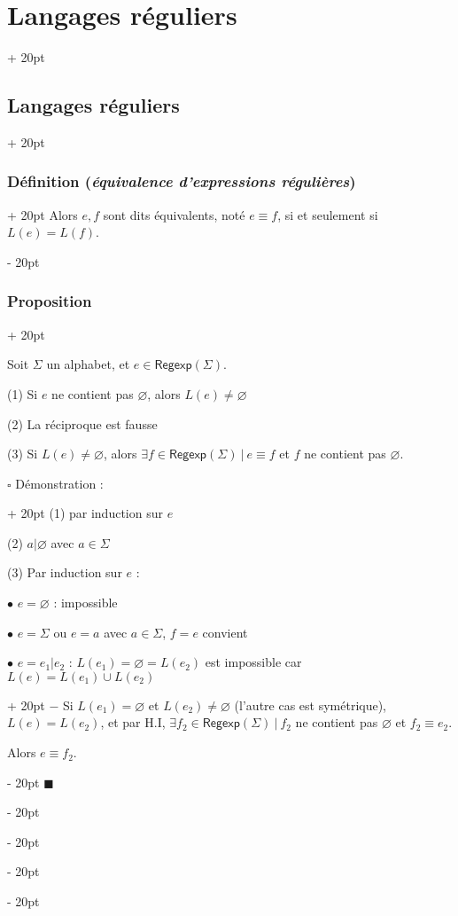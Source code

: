 \documentclass[a4paper, 12pt, twoside]{article}
\newcommand{\ind}[1][20pt]{\advance\leftskip + #1}
\newcommand{\deind}[1][20pt]{\advance\leftskip - #1}
\newenvironment{indt}[2][20pt]{#2 \par \ind[#1]}{\par \deind} %
\newenvironment{proof}[1][{Démonstration :}]{\begin{indt}{$\square$ #1}}{$\blacksquare$ \end{indt}}
\newcommand{\Regexp}{\mathsf{Regexp}}
\begin{document}
\begin{indt}{\section{Langages réguliers}}
\begin{indt}{\subsection{Langages réguliers}}
\begin{indt}{\subsubsection{Définition (\textit{équivalence d'expressions régulières})}}
                Alors $e, f$ sont dits équivalents, noté $e \equiv f$, si et seulement si $L(e) = L(f)$.
            \end{indt}

            \vspace{12pt}
            
            \begin{indt}{\subsubsection{Proposition}}
                \begin{emphBox}
                    Soit $\Sigma$ un alphabet, et $e \in \Regexp(\Sigma)$.

                    (1) Si $e$ ne contient pas $\varnothing$, alors $L(e) \neq \varnothing$

                    (2) La réciproque est fausse

                    (3) Si $L(e) \neq \varnothing$, alors $\exists f \in \Regexp(\Sigma)\ |\ e \equiv f$ et $f$ ne contient pas $\varnothing$.
                \end{emphBox}

                \vspace{12pt}
                
                \begin{proof}
                    (1)  par induction sur $e$

                    (2) $a | \varnothing$ avec $a \in \Sigma$

                    (3) Par induction sur $e$ :

                    $\bullet$ $e = \varnothing$ : impossible

                    $\bullet$ $e = \Sigma$ ou $e = a$ avec $a \in \Sigma$, $f = e$ convient

                    \begin{indt}{$\bullet$ $e = e_1 | e_2$ : $L(e_1) = \varnothing = L(e_2)$ est impossible car $L(e) = L(e_1) \cup L(e_2)$}
                        $-$ Si $L(e_1) = \varnothing$ et $L(e_2) \neq \varnothing$ (l'autre cas est symétrique), $L(e) = L(e_2)$, et par H.I, $\exists f_2 \in \Regexp(\Sigma)\ |\ f_2$ ne contient pas $\varnothing$ et $f_2 \equiv e_2$.

                        Alors $e \equiv f_2$.

                        \vspace{12pt}
                        

\end{indt}
\end{proof}
\end{indt}
\end{indt}
\end{indt}
\end{document}
